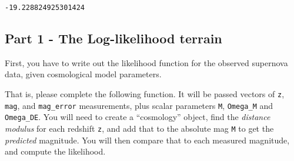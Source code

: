 \documentclass[11pt]{article}
\makeatletter
\newcommand{\boxspacing}{\kern\kvtcb@left@rule\kern\kvtcb@boxsep}
\newcommand{\prompt}[4]{
        {\ttfamily\llap{{\color{#2}[#3]:\hspace{3pt}#4}}\vspace{-\baselineskip}}
    }
\makeatother
\begin{document}
            \begin{tcolorbox}[breakable, size=fbox, boxrule=.5pt, pad at break*=1mm, opacityfill=0]
\prompt{Out}{outcolor}{9}{\boxspacing}
\begin{Verbatim}[commandchars=\\\{\}]
-19.228824925301424
\end{Verbatim}
\end{tcolorbox}
        
    \hypertarget{part-1---the-log-likelihood-terrain}{%
\subsection{Part 1 - The Log-likelihood
terrain}\label{part-1---the-log-likelihood-terrain}}

    First, you have to write out the likelihood function for the observed
supernova data, given cosmological model parameters.

That is, please complete the following function. It will be passed
vectors of \texttt{z}, \texttt{mag}, and \texttt{mag\_error}
measurements, plus scalar parameters \texttt{M}, \texttt{Omega\_M} and
\texttt{Omega\_DE}. You will need to create a ``cosmology'' object, find
the \emph{distance modulus} for each redshift \texttt{z}, and add that
to the absolute mag \texttt{M} to get the \emph{predicted} magnitude.
You will then compare that to each measured magnitude, and compute the
likelihood.
\end{document}

